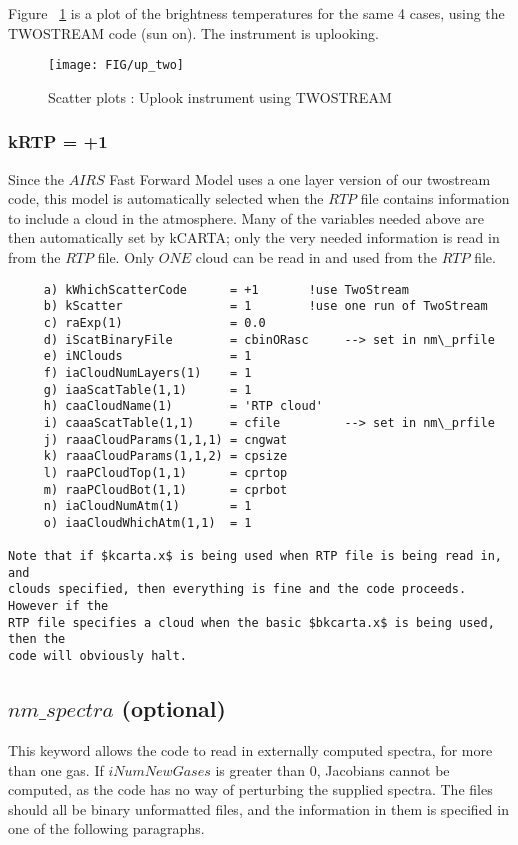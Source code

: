 \documentclass[12pt]{article}
\newcommand{\kc}{\textsf{kCARTA}\xspace}
\begin{document}
{{Figure ~\ref{twostream_up} is a plot of the brightness temperatures for the 
same 4 cases, using the TWOSTREAM code (sun on). The instrument is uplooking. 
\begin{figure}
\texttt{[image: FIG/up\_two]}
\caption{Scatter plots : Uplook instrument using TWOSTREAM}
\label{twostream_up}
\end{figure}

\subsubsection{kRTP = +1}
Since the $AIRS$ Fast Forward Model uses a one layer version of our twostream
code, this model is automatically selected when the $RTP$ file contains 
information to include a cloud in the atmosphere. Many of the variables needed
above are then automatically set by \kc; only the very needed information
is read in from the $RTP$ file. Only $ONE$ cloud can be read in and used from 
the $RTP$ file.
\begin{verbatim}
     a) kWhichScatterCode      = +1       !use TwoStream 
     b) kScatter               = 1        !use one run of TwoStream 
     c) raExp(1)               = 0.0 
     d) iScatBinaryFile        = cbinORasc     --> set in nm\_prfile
     e) iNClouds               = 1 
     f) iaCloudNumLayers(1)    = 1 
     g) iaaScatTable(1,1)      = 1 
     h) caaCloudName(1)        = 'RTP cloud' 
     i) caaaScatTable(1,1)     = cfile         --> set in nm\_prfile
     j) raaaCloudParams(1,1,1) = cngwat 
     k) raaaCloudParams(1,1,2) = cpsize 
     l) raaPCloudTop(1,1)      = cprtop 
     m) raaPCloudBot(1,1)      = cprbot 
     n) iaCloudNumAtm(1)       = 1 
     o) iaaCloudWhichAtm(1,1)  = 1 

Note that if $kcarta.x$ is being used when RTP file is being read in, and 
clouds specified, then everything is fine and the code proceeds. However if the
RTP file specifies a cloud when the basic $bkcarta.x$ is being used, then the
code will obviously halt.
\end{verbatim}

\subsection{$nm\_spectra$ (optional)}

This keyword allows the code to read in externally computed spectra, for more
than one gas. If $iNumNewGases$ is greater than 0, Jacobians cannot be 
computed, as the code has no way of perturbing the supplied spectra. The 
files should all be binary unformatted files, and the information in them
is specified in one of the following paragraphs.

}}
\end{document}

